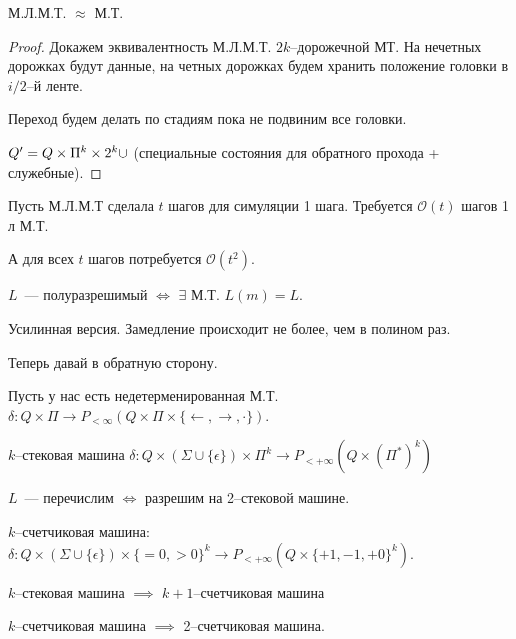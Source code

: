 \begin{statement}
    М.Л.М.Т. $\approx$ М.Т.
\end{statement}
\begin{proof}
    Докажем эквивалентность М.Л.М.Т. $2k$--дорожечной МТ.
    На нечетных дорожках будут данные, на четных дорожках будем хранить положение головки в $ i  / 2$--й ленте.

    Переход будем делать по стадиям пока не подвиним все головки.

    $Q^{\prime} = Q \times \Pi ^k \times 2^k \cup$ (специальные состояния для обратного прохода + служебные).
\end{proof}

\begin{note}
    Пусть М.Л.М.Т сделала $t$ шагов для симуляции 1 шага. Требуется $\mathcal{O} (t)$ шагов 1 л М.Т.

    А для всех $t$ шагов потребуется $\mathcal{O}(t^2)$.
\end{note}

\begin{theorem}
    $L$~--- полуразрешимый $\iff$ $\exists$ М.Т. $L(m) = L$.

    Усилинная версия. Замедление происходит не более, чем в полином раз.
\end{theorem}

Теперь давай в обратную сторону.

Пусть у нас есть недетерменированная М.Т.
$\delta :Q \times \Pi \to P_{< \infty} \left( Q \times \Pi \times \{ \leftarrow, \rightarrow, \cdot \} \right)$.

\begin{definition}
    $k$--стековая машина
    $\delta:Q\times(\Sigma \cup \{ \epsilon\})\times \Pi^k\to P_{<+\infty} \left( Q \times (\Pi^*)^k \right) $
\end{definition}

\begin{theorem}
    $L$~--- перечислим $\iff$ разрешим на 2--стековой машине.
\end{theorem}

\begin{definition}
    $k$--счетчиковая машина:\\
    $\delta: Q\times (\Sigma \cup \{ \epsilon\}) \times \{=0, > 0\}^k \to P_{<+\infty} \left( Q \times \{ +1, -1, +0\}^k \right)$.
\end{definition}

\begin{theorem}
    $k$--стековая машина $\implies$ $k + 1$--счетчиковая машина
\end{theorem}
\begin{theorem}
    $k$--счетчиковая машина $\implies$ 2--счетчиковая машина.
\end{theorem}

